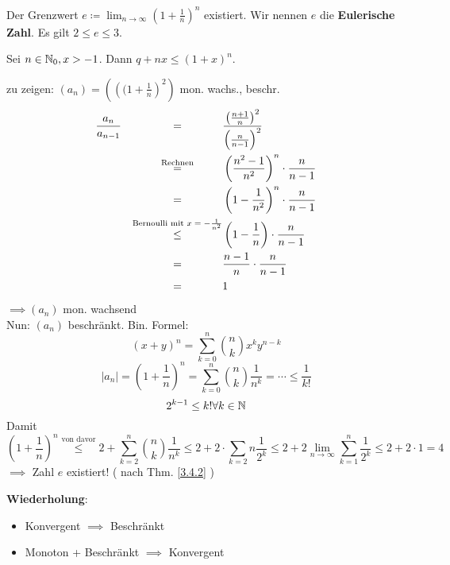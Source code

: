 \begin{subcorollary}
	Der Grenzwert $ e \coloneqq \lim_{n\to\infty} ( 1 + \frac{1}{n} )^n $ existiert.
	Wir nennen $ e $ die \textbf{Eulerische Zahl}. Es gilt $ 2\leq e \leq 3 $.
\end{subcorollary}
\begin{sublemma}
	Sei $n \in \mathbb{N}_0, x > -1$. Dann $ q + nx \leq ( 1 + x ) ^n $.
\end{sublemma}
\begin{subproof*}
	zu zeigen: $ (a_n) = \left( \left(( 1 + \frac{1}{n} \right)^2\right) $ mon. wachs., beschr.
	\begin{alignat*}{2}
		&\frac{a_n}{a_{n-1}} &\omit\hfill$=$\hfill& \frac{\left( \frac{n+1}{n}\right)^2}{\left(\frac{n}{n-1} \right)^2}\\
		&~&\omit\hfill$\overset{\text{Rechnen}}{=}$\hfill& \left( \frac{n^2-1}{n^2} \right)^n \cdot \frac{n}{n-1}\\
		&~&\omit\hfill$=$\hfill& \left( 1 - \frac{1}{n^2} \right)^n \cdot \frac{n}{n-1}\\
		&~&\omit\hfill$\overset{\text{Bernoulli mit $ x = -\frac{1}{n^2}$}}{\leq}$\hfill& \left( 1 - \frac{1}{n} \right) \cdot \frac{n}{n-1}\\
		&~&\omit\hfill$=$\hfill& \frac{n-1}{n} \cdot \frac{n}{n-1}\\
		&~&\omit\hfill$=$\hfill& 1
	\end{alignat*}
	$\implies ( a_n ) $ mon. wachsend\\
	Nun: $(a_n)$ beschränkt. Bin. Formel:
	\[( x + y )^n = \sum_{k=0}^{n} \binom{n}{k} x^ky^{n-k}\]
	\[ |a_n| = \left( 1 + \frac{1}{n} \right)^n = \sum_{k=0}^{n} \binom{n}{k}\frac{1}{n^k} = \dotsb \leq \frac{1}{k!}\]
	\[ 2^{k-1} \leq k! \forall k \in \mathbb{N} \]
	Damit
	\[ \left(1+\frac{1}{n} \right)^n \overset{\text{von davor}}{\leq} 2 + \sum_{k=2}^{n} \binom{n}{k}\frac{1}{n^k} \leq 2 + 2 \cdot \sum_{k=2}{n}\frac{1}{2^k} \leq 2 + 2\lim_{n\to\infty} \sum_{k=1}^{n}\frac{1}{2^k} \leq 2 + 2 \cdot 1 = 4 \]
	$\implies$ Zahl $e$ existiert! ( nach Thm. \ref{3.4.2} ) 
\end{subproof*}

\textbf{Wiederholung}:
\begin{itemize}
	\item Konvergent $\implies$ Beschränkt
	\item Monoton + Beschränkt $\implies$ Konvergent
\end{itemize}

